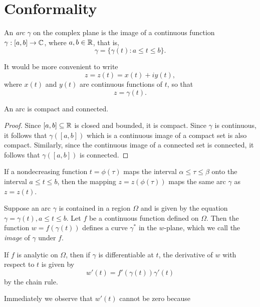 \section{Conformality}

\begin{definition}
    An \emph{arc} \(\gamma\) on the complex plane is the image of a continuous function \(\gamma : [a, b] \to \mathbb{C}\), where \(a, b \in \mathbb{R}\), that is,
    \[
        \gamma = \{\gamma(t) : a \leq t \leq b\}.
    \]
\end{definition}

It would be more convenient to write
\[
    z = z(t) = x(t) + iy(t),
\]
where \(x(t)\) and \(y(t)\) are continuous functions of \(t\), so that
\[
    z = \gamma(t).
\]

\begin{theorem}
    An arc is compact and connected.
\end{theorem}

\begin{proof}
    Since \([a, b] \subseteq \mathbb{R}\) is closed and bounded, it is compact. Since \(\gamma\) is continuous, it follows that \(\gamma([a, b])\) which is a continuous image of a compact set is also compact. Similarly, since the continuous image of a connected set is connected, it follows that \(\gamma([a, b])\) is connected.
\end{proof}

\begin{theorem}
    If a nondecreasing function \(t = \phi(\tau)\) maps the interval \(\alpha \leq \tau \leq \beta\) onto the interval \(a \leq t \leq b\), then the mapping \(z = z(\phi(\tau))\) maps the same arc \(\gamma\) as \(z = z(t)\).
\end{theorem}

Suppose an arc \(\gamma\) is contained in a region \(\Omega\) and is given by the equation \(\gamma = \gamma(t), a \leq t \leq b\). Let \(f\) be a continuous function defined on \(\Omega\). Then the function \(w = f(\gamma(t))\) defines a curve \(\gamma^*\) in the \(w\)-plane, which we call the \emph{image} of \(\gamma\) under \(f\).

If \(f\) is analytic on \(\Omega\), then if \(\gamma\) is differentiable at \(t\), the derivative of \(w\) with respect to \(t\) is given by
\[
    w'(t) = f'(\gamma(t))\gamma'(t)
\]
by the chain rule.

Immediately we observe that \(w'(t)\) cannot be zero because 